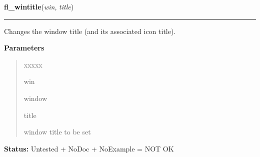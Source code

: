 \hspace{.8\funcindent}\begin{boxedminipage}{\funcwidth}

    \raggedright \textbf{fl\_wintitle}(\textit{win}, \textit{title})

    \vspace{-1.5ex}

    \rule{\textwidth}{0.5\fboxrule}
\setlength{\parskip}{2ex}
    Changes the window title (and its associated icon title).

\setlength{\parskip}{1ex}
      \textbf{Parameters}
      \vspace{-1ex}

      \begin{quote}
        \begin{Ventry}{xxxxx}

          \item[win]

          window

          \item[title]

          window title to be set

        \end{Ventry}

      \end{quote}

\textbf{Status:} Untested + NoDoc + NoExample = NOT OK



    \end{boxedminipage}

    \label{xformslib:library:fl_winicontitle}

    \vspace{0.5ex}

